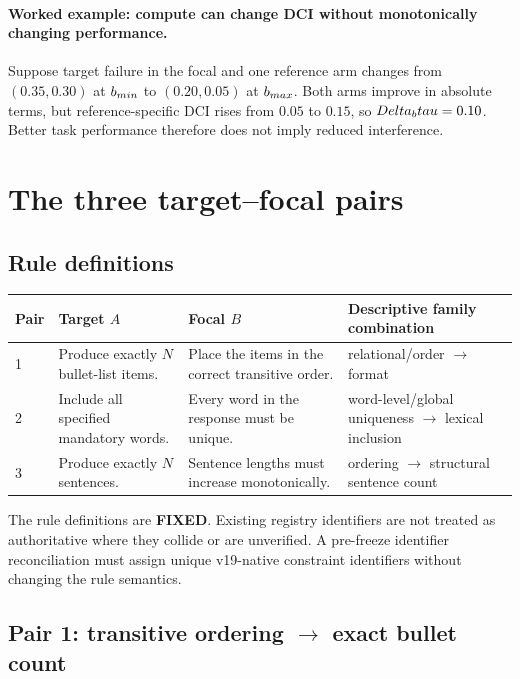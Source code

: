 \documentclass[11pt,a4paper]{article}
\newcommand{\FIXED}{\textbf{FIXED}}
\begin{document}
\paragraph{Worked example: compute can change DCI without monotonically changing performance.}
Suppose target failure in the focal and one reference arm changes from $(0.35,0.30)$ at $b_{\\min}$ to $(0.20,0.05)$ at $b_{\\max}$. Both arms improve in absolute terms, but reference-specific DCI rises from $0.05$ to $0.15$, so $\\Delta_b\\tau=0.10$. Better task performance therefore does not imply reduced interference.

\section{The three target--focal pairs}

\subsection{Rule definitions}

\begin{longtable}{p{}p{}p{}p{}}
\toprule
\textbf{Pair} & \textbf{Target $A$} & \textbf{Focal $B$} & \textbf{Descriptive family combination} \\
\midrule
\endhead
1 & Produce exactly $N$ bullet-list items. & Place the items in the correct transitive order. & relational/order $\rightarrow$ format \\
2 & Include all specified mandatory words. & Every word in the response must be unique. & word-level/global uniqueness $\rightarrow$ lexical inclusion \\
3 & Produce exactly $N$ sentences. & Sentence lengths must increase monotonically. & ordering $\rightarrow$ structural sentence count \\
\bottomrule
\end{longtable}

The rule definitions are \FIXED. Existing registry identifiers are not treated as authoritative where they collide or are unverified. A pre-freeze identifier reconciliation must assign unique v19-native constraint identifiers without changing the rule semantics.

\subsection{Pair 1: transitive ordering \texorpdfstring{$\rightarrow$}{to} exact bullet count}
\end{document}
